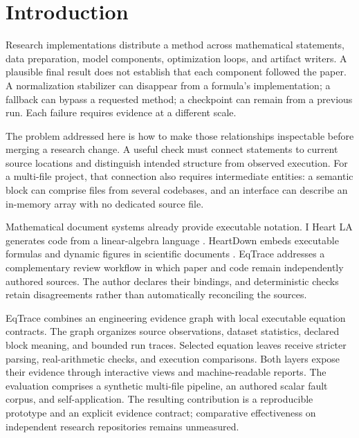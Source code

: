 \section{Introduction}
\label{sec:intro}
Research implementations distribute a method across mathematical statements, data preparation, model components, optimization loops, and artifact writers. A plausible final result does not establish that each component followed the paper. A normalization stabilizer can disappear from a formula's implementation; a fallback can bypass a requested method; a checkpoint can remain from a previous run. Each failure requires evidence at a different scale.

The problem addressed here is how to make those relationships inspectable before merging a research change. A useful check must connect statements to current source locations and distinguish intended structure from observed execution. For a multi-file project, that connection also requires intermediate entities: a semantic block can comprise files from several codebases, and an interface can describe an in-memory array with no dedicated source file.

Mathematical document systems already provide executable notation. I Heart LA generates code from a linear-algebra language \citep{LiIHeartLA2021}. HeartDown embeds executable formulas and dynamic figures in scientific documents \citep{LiHeartDown2022}. EqTrace addresses a complementary review workflow in which paper and code remain independently authored sources. The author declares their bindings, and deterministic checks retain disagreements rather than automatically reconciling the sources.

EqTrace combines an engineering evidence graph with local executable equation contracts. The graph organizes source observations, dataset statistics, declared block meaning, and bounded run traces. Selected equation leaves receive stricter parsing, real-arithmetic checks, and execution comparisons. Both layers expose their evidence through interactive views and machine-readable reports. The evaluation comprises a synthetic multi-file pipeline, an authored scalar fault corpus, and self-application. The resulting contribution is a reproducible prototype and an explicit evidence contract; comparative effectiveness on independent research repositories remains unmeasured.
